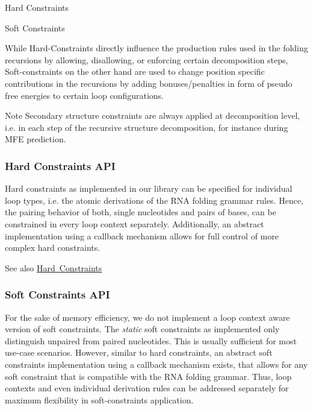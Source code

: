 \begin{DoxyItemize}
\item Hard Constraints
\item Soft Constraints
\end{DoxyItemize}

While Hard-\/\+Constraints directly influence the production rules used in the folding recursions by allowing, disallowing, or enforcing certain decomposition steps, Soft-\/constraints on the other hand are used to change position specific contributions in the recursions by adding bonuses/penalties in form of pseudo free energies to certain loop configurations.

\begin{DoxyNote}{Note}
Secondary structure constraints are always applied at decomposition level, i.\+e. in each step of the recursive structure decomposition, for instance during M\+FE prediction.
\end{DoxyNote}
\hypertarget{folding_grammar_sec_constraints_hard_api}{}\subsubsection{Hard Constraints A\+PI}\label{folding_grammar_sec_constraints_hard_api}
Hard constraints as implemented in our library can be specified for individual loop types, i.\+e. the atomic derivations of the R\+NA folding grammar rules. Hence, the pairing behavior of both, single nucleotides and pairs of bases, can be constrained in every loop context separately. Additionally, an abstract implementation using a callback mechanism allows for full control of more complex hard constraints.

\begin{DoxySeeAlso}{See also}
\mbox{\hyperlink{group__hard__constraints}{Hard Constraints}}
\end{DoxySeeAlso}
\hypertarget{folding_grammar_sec_constraints_soft_api}{}\subsubsection{Soft Constraints A\+PI}\label{folding_grammar_sec_constraints_soft_api}
For the sake of memory efficiency, we do not implement a loop context aware version of soft constraints. The {\itshape static} soft constraints as implemented only distinguish unpaired from paired nucleotides. This is usually sufficient for most use-\/case scenarios. However, similar to hard constraints, an abstract soft constraints implementation using a callback mechanism exists, that allows for any soft constraint that is compatible with the R\+NA folding grammar. Thus, loop contexts and even individual derivation rules can be addressed separately for maximum flexibility in soft-\/constraints application.


